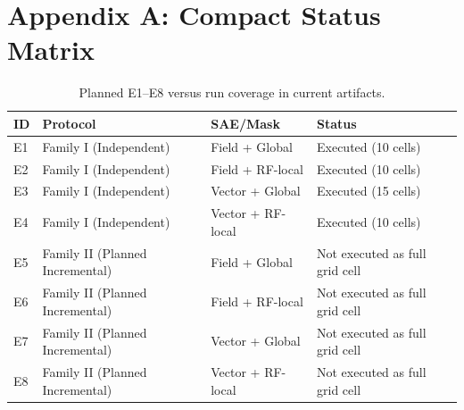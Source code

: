 \documentclass[11pt]{article}
\begin{document}
\section{Appendix A: Compact Status Matrix}
\begin{table}[h!]
\centering
\caption{Planned E1--E8 versus run coverage in current artifacts.}
\begin{tabular}{llll}
\toprule
ID & Protocol & SAE/Mask & Status \\
\midrule
E1 & Family I (Independent) & Field + Global & Executed (10 cells) \\
E2 & Family I (Independent) & Field + RF-local & Executed (10 cells) \\
E3 & Family I (Independent) & Vector + Global & Executed (15 cells) \\
E4 & Family I (Independent) & Vector + RF-local & Executed (10 cells) \\
E5 & Family II (Planned Incremental) & Field + Global & Not executed as full grid cell \\
E6 & Family II (Planned Incremental) & Field + RF-local & Not executed as full grid cell \\
E7 & Family II (Planned Incremental) & Vector + Global & Not executed as full grid cell \\
E8 & Family II (Planned Incremental) & Vector + RF-local & Not executed as full grid cell \\
\bottomrule
\end{tabular}
\end{table}
\end{document}
